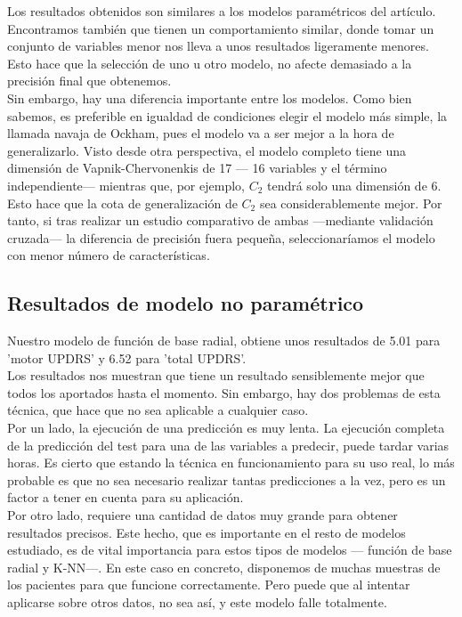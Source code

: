 Los resultados obtenidos son similares a los modelos paramétricos del artículo. Encontramos también que tienen un comportamiento similar, donde tomar un conjunto de variables menor nos lleva a unos resultados ligeramente menores. Esto hace que la selección de uno u otro modelo, no afecte demasiado a la precisión final que obtenemos.\\

Sin embargo, hay una diferencia importante entre los modelos. Como bien sabemos, es preferible en igualdad de condiciones elegir el modelo más simple, la llamada navaja de Ockham, pues el modelo va a ser mejor a la hora de generalizarlo. Visto desde otra perspectiva, el modelo completo tiene una dimensión de Vapnik-Chervonenkis de 17 --- 16 variables y el término independiente--- mientras que, por ejemplo, $C_2$ tendrá solo una dimensión de 6.\\

Esto hace que la cota de generalización de $C_2$ sea considerablemente mejor. Por tanto, si tras realizar un estudio comparativo de ambas ---mediante validación cruzada--- la diferencia de precisión fuera pequeña, seleccionaríamos el modelo con menor número de características.\\

\subsection{Resultados de modelo no paramétrico}

Nuestro modelo de función de base radial, obtiene unos resultados de 5.01 para 'motor UPDRS' y 6.52 para 'total UPDRS'.\\

Los resultados nos muestran que tiene un resultado sensiblemente mejor que todos los aportados hasta el momento. Sin embargo, hay dos problemas de esta técnica, que hace que no sea aplicable a cualquier caso.\\

Por un lado, la ejecución de una predicción es muy lenta. La ejecución completa de la predicción del test para una de las variables a predecir, puede tardar varias horas. Es cierto que estando la técnica en funcionamiento para su uso real, lo más probable es que no sea necesario realizar tantas predicciones a la vez, pero es un factor a tener en cuenta para su aplicación.\\

Por otro lado, requiere una cantidad de datos muy grande para obtener resultados precisos. Este hecho, que es importante en el resto de modelos estudiado, es de vital importancia para estos tipos de modelos --- función de base radial y K-NN---. En este caso en concreto, disponemos de muchas muestras de los pacientes para que funcione correctamente. Pero puede que al intentar aplicarse sobre otros datos, no sea así, y este modelo falle totalmente.\\

